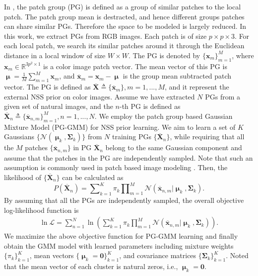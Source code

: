 \documentclass[10pt,twocolumn,letterpaper]{article}
\begin{document}
In \cite{pgpd}, the patch group (PG) is defined as a group of similar patches to the local patch. The patch group mean is destracted, and hence different groups patches can share similar PGs. Therefore the space to be modeled is largely reduced. In this work, we extract PGs from RGB images. Each patch is of size $p\times p \times 3$. For each local patch, we search its similar patches around it through the Euclidean distance in a local window of size $W\times W$. The PG is denoted by $\{\mathbf{x}_{m}\}_{m=1}^{M}$, where $\mathbf{x}_{m}\in \mathbb{R}^{3p^{2}\times1}$ is a color image patch vector. The mean vector of this PG is $\boldsymbol{\upmu}=\frac{1}{M}\sum_{m=1}^{M}\mathbf{x}_{m}$, and $\mathbf{\overline{x}}_{m}=\mathbf{x}_{m}-\boldsymbol{\upmu}$ is the group mean subtracted patch vector. The PG is defined as $\mathbf{\overline{X}}\triangleq \{\mathbf{\overline{x}}_{m}\}, m=1,...,M$, and it represent the external NSS prior on color images. Assume we have extracted $N$ PGs from a given set of natural images, and the $n$-th PG is defined as $\mathbf{\overline{X}}_{n}\triangleq \{\mathbf{\overline{x}}_{n,m}\}_{m=1}^{M}, n=1,...,N$. We employ the patch group based Gaussian Mixture Model (PG-GMM) for NSS prior learning. We aim to learn a set of $K$ Gaussians $\{\mathcal{N}(\boldsymbol{\upmu}_{k},\mathbf{\Sigma}_{k})\}$ from $N$ training PGs $\{\mathbf{\overline{X}}_{n}\}$, while requiring that all the $M$ patches $\{\mathbf{\overline{x}}_{n,m}\}$  in PG $\mathbf{\overline{X}}_{n}$ belong to the same Gaussian component and assume that the patches in the PG are independently sampled. Note that such an assumption is commonly used in patch based image modeling \cite{ksvd,lssc}. Then, the likelihood of $\{\mathbf{\overline{X}}_{n}\}$ can be calculated as
\begin{equation}\label{equ1}
P(\mathbf{\overline{X}}_{n})  = \sum\nolimits_{k=1}^{K}\pi_{k}\prod\nolimits_{m=1}^{M}\mathcal{N}(\mathbf{\overline{x}}_{n,m}|\boldsymbol{\upmu}_{k},\mathbf{\Sigma}_{k}).
\end{equation}
By assuming that all the PGs are independently sampled, the overall objective log-likelihood function is
\begin{equation}\label{equ2}
\begin{split}
\ln\mathcal{L}=\sum_{n=1}^{N} \ln(\sum_{k=1}^{K}\pi_{k}\prod_{m=1}^{M}\mathcal{N}(\mathbf{\overline{x}}_{n,m}|\boldsymbol{\upmu}_{k},\mathbf{\Sigma}_{k})).
\end{split}
\end{equation} 
We maximize the above objective function for PG-GMM learning and  finally obtain the GMM model with learned parameters including mixture weights $\{\pi_{k}\}_{k=1}^{K}$, mean vectors $\{\boldsymbol{\upmu}_{k}=\mathbf{0}\}_{k=1}^{K}$, and covariance matrices $\{\mathbf{\Sigma}_{k}\}_{k=1}^{K}$. Noted that the mean vector of each cluster is natural zeros, i.e., $\boldsymbol{\upmu}_{k}=\mathbf{0}$.
\end{document}
